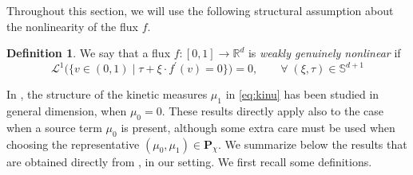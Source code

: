 \documentclass[11pt, twoside, reqno]{amsart}
\theoremstyle{definition}
\newtheorem{defi}[thm]{Definition}
\theoremstyle{remark}
\numberwithin{equation}{section}
\newcommand{\msc}[1]{\mathscr{#1}}
\begin{document}
Throughout this section, we will use the following structural assumption about the nonlinearity of the flux $f$.
\begin{defi}\label{def:fluxgenn}
    We say that a flux $f: [0, 1] \to \mathbb  R^d$ is \textit{weakly genuinely nonlinear} if 
    \begin{equation}\label{eq:genuinon}
        \msc L^1 \Big( \big\{ v \in (0, 1) \; \big| \; \tau + \xi \cdot f^{\prime}(v) = 0 \big\}\Big) = 0, \qquad \forall \; 
        (\xi, \tau)  \in \mathbb S ^{d+1}
    \end{equation}
\end{defi}
In \cite{DOW03}, the structure of the kinetic measures $\mu_1$ in \eqref{eq:kinu}  has been studied in general dimension, when $\mu_0 = 0$. These results directly apply also to the case when a source term $\mu_0$ is present, although some extra care must be used when choosing the representative $(\mu_0, \mu_1) \in \mathbf P_\chi$. We summarize below the results that are obtained directly from \cite{DOW03}, in our setting. We first recall some definitions.
\end{document}
